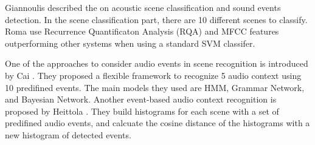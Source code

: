 Giannoulis \cite{giannoulis2013applications} described the on acoustic scene classification and sound events detection.  
In the scene classification part, there are 10 different scenes to classify. 
Roma \cite{romarecurrence} use Recurrence Quantificaton Analysis (RQA) and MFCC features outperforming other systems when using a standard SVM classifer. 

One of the approaches to consider audio events in scene recognition is introduced by Cai  \cite{cai2006flexible}. 
They proposed a flexible framework to recognize 5 audio context using 10 predifined events. 
The main models they used are HMM, Grammar Network, and Bayesian Network. 
Another event-based audio context recognition is proposed by Heittola \cite{heittola2010audio}. 
They build histograms for each scene with a set of predifined audio events, and calcuate the cosine distance of the histograms with a new histogram of detected events.\\

